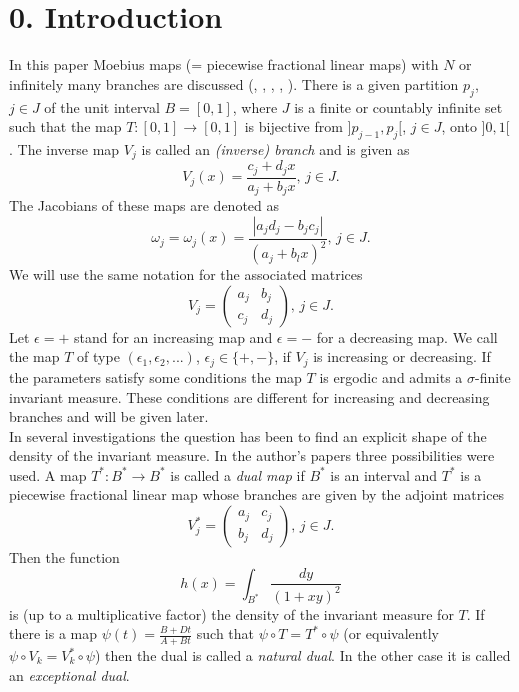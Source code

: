 \documentclass[12pt]{article}
\begin{document}
	\section*{0. Introduction}
	In this paper Moebius maps (= piecewise fractional linear maps) with $N$ or infinitely many branches are discussed (\cite{Sch95}, \cite{Sch06}, \cite{Sch16} \cite{Sch17}, \cite{Sch18a}, \cite{Sch18b}). There is a given partition $p_j$, $ j \in J$ of the unit interval $B = [0,1]$, where $J$ is a finite or countably infinite set such that the map $T: [0,1]  \to [0,1]$ is bijective from $]p_{j-1}, p_j[$, $j \in J$, onto $ ]0,1[$. The inverse map $V_j$  is called an {\em (inverse) branch} and is given as $$V_j (x)= \frac{ c_j + d_j x}{a_j + b_j x}, \, j \in J. $$
	The Jacobians of these maps are denoted as $$\omega_j = \omega_j(x) = \frac{\left| a_j d_j - b_j c_j\right| }{(a_j + b_l x)^2}, \, j \in J .$$  We will use the same notation for the associated matrices $$V_j =  \left( \begin{array}{cc}a_j &  b_j
		\\ c_j & d_j \end{array} \right), \, j \in J. $$
	Let $\epsilon = +$ stand for an increasing map and $\epsilon = -$ for a decreasing map. We call the map $T$ of type $(\epsilon_1, \epsilon_2, ...)$, $\epsilon_j \in \{+, -\}$, if $V_j$ is increasing or decreasing. If the parameters satisfy some conditions the map $T$ is ergodic and admits a $\sigma$-finite invariant measure. These conditions are different for increasing and decreasing branches and will be given later. \\
	In several investigations the question has been to find an explicit shape of the density of the invariant measure. In the author's papers three possibilities were used. A map $T^{*}:  B^{*} \to B^{*}$ is called a {\em dual map}  if $B^{*}$ is an interval and $T^{*}$ is a piecewise fractional linear map whose branches are given by the adjoint  matrices  
	$$V_j^{*}  =  \left( \begin{array}{cc}a_j &  c_j
		\\ b_j & d_j \end{array} \right), \, j \in J. $$
	Then the function
	$$h(x) = \int_{B^{*}} \frac{dy}{(1+xy)^2}$$
	is (up to a multiplicative factor) the density of the invariant measure for $T$. 
	If there is a map $\psi(t) = \frac{B +Dt}{A+Bt}$ such that $ \psi \circ T = T^{*} \circ  \psi$  (or equivalently $ \psi \circ V_k  = V_k^{*} \circ  \psi$) then the dual is called a {\em natural dual}. In the other case it is called an {\em exceptional dual}. 
\end{document}
